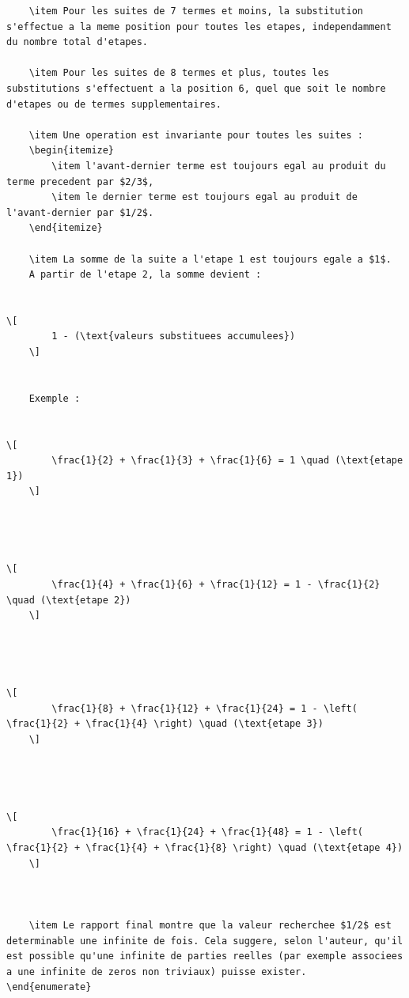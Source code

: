 \documentclass[a4paper,11pt]{article}
\begin{document}
\begin{holcode}[title={\textcolor{white}{Fichier : methode\_de\_philippot.thy -- COMPLET}}]
\begin{lstlisting}
    \item Pour les suites de 7 termes et moins, la substitution s'effectue a la meme position pour toutes les etapes, independamment du nombre total d'etapes.
    
    \item Pour les suites de 8 termes et plus, toutes les substitutions s'effectuent a la position 6, quel que soit le nombre d'etapes ou de termes supplementaires.
    
    \item Une operation est invariante pour toutes les suites :  
    \begin{itemize}
        \item l'avant-dernier terme est toujours egal au produit du terme precedent par $2/3$,  
        \item le dernier terme est toujours egal au produit de l'avant-dernier par $1/2$.
    \end{itemize}
    
    \item La somme de la suite a l'etape 1 est toujours egale a $1$.  
    A partir de l'etape 2, la somme devient :
    

\[
        1 - (\text{valeurs substituees accumulees})
    \]


    Exemple :
    

\[
        \frac{1}{2} + \frac{1}{3} + \frac{1}{6} = 1 \quad (\text{etape 1})
    \]


    

\[
        \frac{1}{4} + \frac{1}{6} + \frac{1}{12} = 1 - \frac{1}{2} \quad (\text{etape 2})
    \]


    

\[
        \frac{1}{8} + \frac{1}{12} + \frac{1}{24} = 1 - \left( \frac{1}{2} + \frac{1}{4} \right) \quad (\text{etape 3})
    \]


    

\[
        \frac{1}{16} + \frac{1}{24} + \frac{1}{48} = 1 - \left( \frac{1}{2} + \frac{1}{4} + \frac{1}{8} \right) \quad (\text{etape 4})
    \]


    
    \item Le rapport final montre que la valeur recherchee $1/2$ est determinable une infinite de fois. Cela suggere, selon l'auteur, qu'il est possible qu'une infinite de parties reelles (par exemple associees a une infinite de zeros non triviaux) puisse exister.
\end{enumerate}



\end{lstlisting}
\end{holcode}
\end{document}
